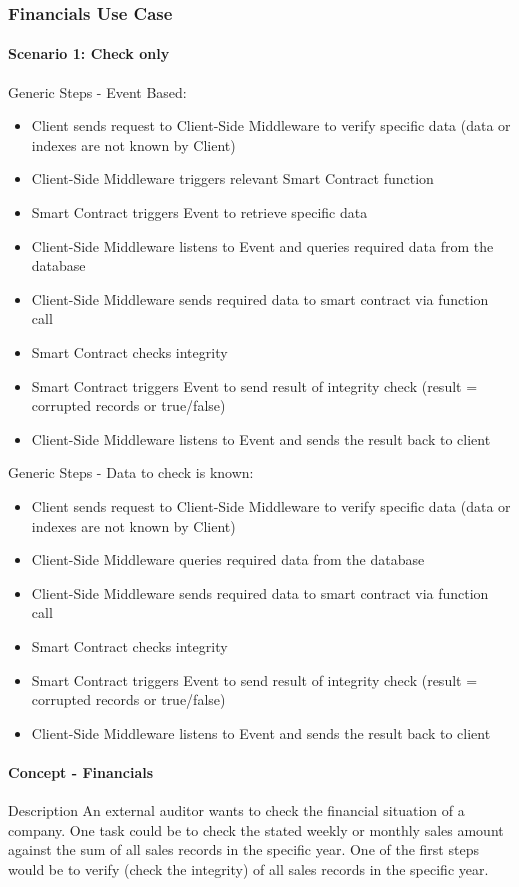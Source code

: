 \subsubsection{Financials Use Case}
\paragraph{Scenario 1: Check only}
Generic Steps - Event Based:
\begin{itemize}
\item Client sends request to Client-Side Middleware to verify specific data (data or indexes are not known by Client)
\item Client-Side Middleware triggers relevant Smart Contract function
\item Smart Contract triggers Event to retrieve specific data
\item Client-Side Middleware listens to Event and queries required data from the database
\item Client-Side Middleware sends required data to smart contract via function call
\item Smart Contract checks integrity
\item Smart Contract triggers Event to send result of integrity check (result = corrupted records or true/false)
\item Client-Side Middleware listens to Event and sends the result back to client
\end{itemize}

Generic Steps - Data to check is known:
\begin{itemize}
\item Client sends request to Client-Side Middleware to verify specific data (data or indexes are not known by Client)
\item Client-Side Middleware queries required data from the database
\item Client-Side Middleware sends required data to smart contract via function call
\item Smart Contract checks integrity
\item Smart Contract triggers Event to send result of integrity check (result = corrupted records or true/false)
\item Client-Side Middleware listens to Event and sends the result back to client
\end{itemize}

\paragraph{Concept - Financials}
Description
An external auditor wants to check the financial situation of a company. One task could be to check the stated weekly or monthly sales amount against the sum of all sales records in the specific year. One of the first steps would be to verify (check the integrity) of all sales records in the specific year.

